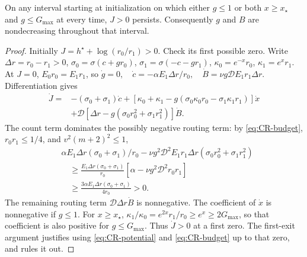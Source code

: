 \begin{lemma}
\label{lem:CR-monotone}
On any interval starting at initialization on which either $g\le1$ or both $x\ge x_\star$ and $g\le G_{\max}$ at every time,
$J>0$ persists. Consequently $g$ and $B$ are nondecreasing throughout that interval.
\end{lemma}
\begin{proof}
Initially $J=h^\star+\log(r_0/r_1)>0$. Check its first possible zero.
Write $\Delta r=r_0-r_1>0$, $\sigma_0=\sigma(c+gr_0)$, $\sigma_1=\sigma(-c-gr_1)$,
$\kappa_0=e^{-x}r_0$, $\kappa_1=e^xr_1$.
At $J=0$, $E_0r_0=E_1r_1$, so
 $\dot g=0,\quad \dot c=-\alpha E_1\Delta r/r_0,\quad \dot B=\nu g\mathcal DE_1r_1\Delta r.$ 
Differentiation gives
\begin{align*}
 \dot J={}&-(\sigma_0+\sigma_1)\dot c
 +[\kappa_0+\kappa_1-g(\sigma_0\kappa_0r_0-\sigma_1\kappa_1r_1)]\dot x\\
 &+\mathcal D[\Delta r-g(\sigma_0r_0^2+\sigma_1r_1^2)]\dot B.
\end{align*}
The count term dominates the possibly negative routing term: by \eqref{eq:CR-budget}, $r_0r_1\le1/4$, and $v^2(m+2)^2\le1$,
\begin{align*}
 &\alpha E_1\Delta r(\sigma_0+\sigma_1)/r_0
 -\nu g^2\mathcal D^2E_1r_1\Delta r(\sigma_0r_0^2+\sigma_1r_1^2)\\
 &\hspace{1em}\ge\frac{E_1\Delta r(\sigma_0+\sigma_1)}{r_0}
       [\alpha-\nu g^2\mathcal D^2r_0r_1]\\
 &\hspace{1em}\ge\frac{3\alpha E_1\Delta r(\sigma_0+\sigma_1)}{4r_0}>0.
\end{align*}
The remaining routing term $\mathcal D\Delta r\dot B$ is nonnegative.
The coefficient of $\dot x$ is nonnegative if $g\le1$.
For $x\ge x_\star$, $\kappa_1/\kappa_0=e^{2x}r_1/r_0\ge e^x\ge2G_{\max}$, so that coefficient is also positive for $g\le G_{\max}$.
Thus $\dot J>0$ at a first zero. The first-exit argument justifies using \eqref{eq:CR-potential} and \eqref{eq:CR-budget} up to that zero, and rules it out.
\end{proof}

